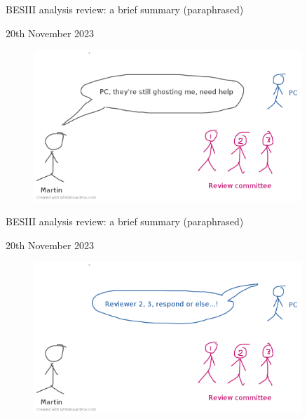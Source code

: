 \documentclass{beamer}
\begin{document}
\begin{frame}{BESIII analysis review: a brief summary (paraphrased)}
  \begin{center}
    {\large 20th November 2023\phantom{p}}
  \end{center}
  \begin{figure}
    \includegraphics[width=0.9\textwidth,trim={0 0 0 0.5cm},clip=true]{Plots/BESIII_review_process_11.png}
  \end{figure}
\end{frame}

\begin{frame}{BESIII analysis review: a brief summary (paraphrased)}
  \begin{center}
    {\large 20th November 2023\phantom{p}}
  \end{center}
  \begin{figure}
    \includegraphics[width=0.9\textwidth,trim={0 0 0 0.5cm},clip=true]{Plots/BESIII_review_process_12.png}
  \end{figure}
\end{frame}
\end{document}
